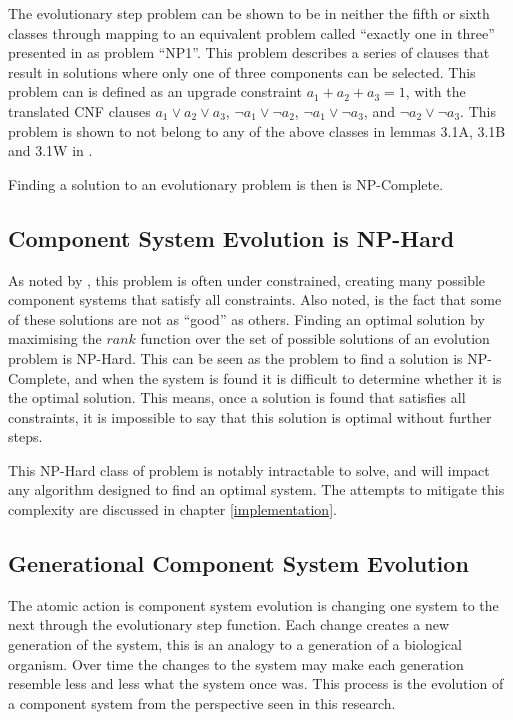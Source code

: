 The evolutionary step problem can be shown to be in neither the fifth or sixth classes 
through mapping to an equivalent problem called ``exactly one in three'' presented in \citep{Schaefer1978} as problem ``NP1''.
This problem describes a series of clauses that result in solutions where only one of three components can be selected. 
This problem can is defined as an upgrade constraint $a_1 + a_2 + a_3 = 1$,  
with the translated CNF clauses $a_1 \vee a_2 \vee a_3$, $\neg a_1 \vee \neg a_2$, $\neg a_1 \vee \neg a_3$, and $\neg a_2 \vee \neg a_3$.
This problem is shown to not belong to any of the above classes in lemmas 3.1A, 3.1B and 3.1W in \citep{Schaefer1978}.

Finding a solution to an evolutionary problem is then is NP-Complete. 

\subsection{Component System Evolution is NP-Hard}
As noted by \citep{Berre2008}, this problem is often under constrained, creating many possible component systems that satisfy all constraints.
Also noted, is the fact that some of these solutions are not as ``good'' as others.
Finding an optimal solution by maximising the $rank$ function over the set of possible solutions of an evolution problem is NP-Hard.
This can be seen as the problem to find a solution is NP-Complete, and when the system is found it is difficult to determine whether it is the optimal solution.
This means, once a solution is found that satisfies all constraints, it is impossible to say that this solution is optimal without further steps. 

This NP-Hard class of problem is notably intractable to solve, and will impact any algorithm designed to find an optimal system.
The attempts to mitigate this complexity are discussed in chapter \ref{implementation}.

\subsection{Generational Component System Evolution}
\label{formal.evo}
The atomic action is component system evolution is changing one system to the next through the evolutionary step function.
Each change creates a new generation of the system, this is an analogy to a generation of a biological organism.
Over time the changes to the system may make each generation resemble less and less what the system once was.
This process is the evolution of a component system from the perspective seen in this research. 

